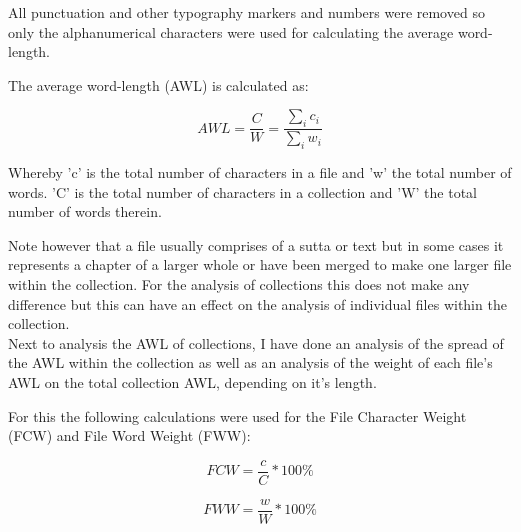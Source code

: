 All punctuation and other typography markers and numbers were removed so only the alphanumerical characters were used for calculating the average word-length.

The average word-length (AWL) is calculated as:

\[
AWL = \frac{C}{W} = \frac{\sum_{i} c_{i}}{\sum_{i} w_{i}}
\]

Whereby 'c' is the total number of characters in a file and 'w' the total number of words. 'C' is the total number of characters in a collection and 'W' the total number of words therein. 

Note however that a file usually comprises of a sutta or text but in some cases it represents a chapter of a larger whole or have been merged to make one larger file within the collection. For the analysis of collections this does not make any difference but this can have an effect on the analysis of individual files within the collection.\\

Next to analysis the AWL of collections, I have done an analysis of the spread of the AWL within the collection as well as an analysis of the weight of each file's AWL on the total collection AWL, depending on it's length.

For this the following calculations were used for the File Character Weight (FCW) and File Word Weight (FWW):

\[
FCW = \frac{c}{C}*100\%
\]

\[
FWW = \frac{w}{W}*100\%
\]
